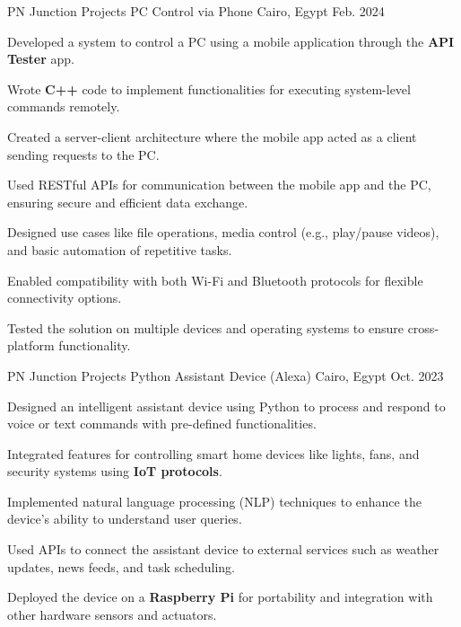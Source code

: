 \begin{cventries}
\cventry
{\normalsize PN Junction Projects } %
{\Large PC Control via Phone} %
{\normalsize Cairo, Egypt} %
{\normalsize Feb. 2024} %
{
    \begin{cvitems} %
        \item {Developed a system to control a PC using a mobile application through the \textbf{API Tester} app.}
    \item {Wrote \textbf{C++} code to implement functionalities for executing system-level commands remotely.}
    \item {Created a server-client architecture where the mobile app acted as a client sending requests to the PC.}
    \item {Used RESTful APIs for communication between the mobile app and the PC, ensuring secure and efficient data exchange.}
    \item {Designed use cases like file operations, media control (e.g., play/pause videos), and basic automation of repetitive tasks.}
    \item {Enabled compatibility with both Wi-Fi and Bluetooth protocols for flexible connectivity options.}
    \item {Tested the solution on multiple devices and operating systems to ensure cross-platform functionality.}
    \end{cvitems}
}
\cventry
{\normalsize PN Junction Projects} %
{\Large Python Assistant Device (Alexa)} %
{\normalsize Cairo, Egypt} %
{\normalsize Oct. 2023} %
{
      \begin{cvitems} %
        \item {Designed an intelligent assistant device using Python to process and respond to voice or text commands with pre-defined functionalities.}
    \item {Integrated features for controlling smart home devices like lights, fans, and security systems using \textbf{IoT protocols}.}
    \item {Implemented natural language processing (NLP) techniques to enhance the device's ability to understand user queries.}
    \item {Used APIs to connect the assistant device to external services such as weather updates, news feeds, and task scheduling.}
    \item {Deployed the device on a \textbf{Raspberry Pi} for portability and integration with other hardware sensors and actuators.}

\end{cvitems}}
\end{cventries}
